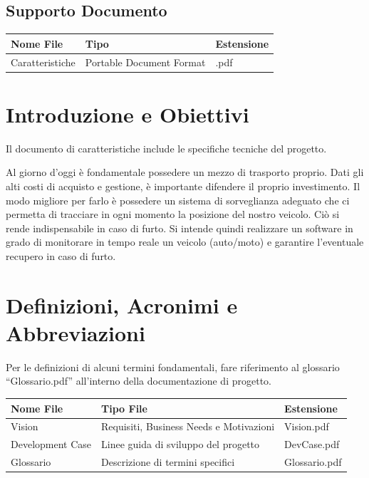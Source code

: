 \documentclass[a4paper,12pt]{article}
\begin{document}
\subsection{Supporto Documento}
\begin{table}[ht]
\begin{center}
\begin{tabular}{p{6cm} p{5cm} p{2cm}}
\rowcolor{Ash}
\hline
Nome File & Tipo & Estensione \\ \hline
Caratteristiche & Portable Document Format & .pdf \\ \hline
\end{tabular}
\end{center}
\end{table}

\clearpage

\pagebreak

\section{Introduzione e Obiettivi}
Il documento di caratteristiche include le specifiche tecniche del progetto.

Al giorno d'oggi è fondamentale possedere un mezzo di trasporto proprio.
Dati gli alti costi di acquisto e gestione, è importante difendere il proprio investimento. Il modo migliore per farlo è possedere un sistema di sorveglianza adeguato che ci permetta di tracciare in ogni momento la posizione del nostro veicolo. Ciò si rende indispensabile in caso di furto.
Si intende quindi realizzare un software in grado di monitorare in tempo reale un veicolo (auto/moto) e garantire l’eventuale recupero in caso di furto.

\section{Definizioni, Acronimi e Abbreviazioni}

Per le definizioni di alcuni termini fondamentali, fare riferimento al glossario ``Glossario.pdf'' all'interno della documentazione di progetto.

\begin{table}[h]
\begin{center}
\begin{tabular}{ l  l  l } 
\rowcolor{Ash}	
\hline	
Nome File & Tipo File & Estensione  \\ \hline
Vision & Requisiti, Business Needs e Motivazioni & Vision.pdf  \\ 
Development Case & Linee guida di sviluppo del progetto & DevCase.pdf  \\ 
Glossario & Descrizione di termini specifici & Glossario.pdf  \\ \hline
\end{tabular}
\end{center}
\end{table}
\end{document}
